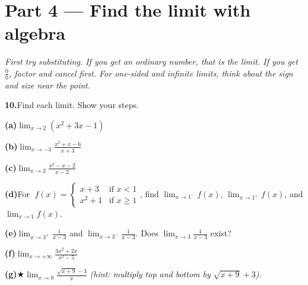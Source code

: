 \documentclass[12pt]{article}
\newcommand{\gridaxes}[1]{%
  \draw[step=1,gray!25,very thin] (-#1,-#1) grid (#1,#1);%
  \draw[thick,->] (-#1-0.4,0)--(#1+0.4,0) node[right]{$x$};%
  \draw[thick,->] (0,-#1-0.4)--(0,#1+0.4) node[above]{$y$};%
  \foreach \n in {-#1,...,#1}{\ifnum\n=0\else
      \draw (\n,0.08)--(\n,-0.08) node[below]{\scriptsize$\n$};
      \draw (0.08,\n)--(-0.08,\n) node[left]{\scriptsize$\n$};\fi}%
}
\begin{document}
\begin{center}
\end{center}

\newpage
\section*{Part 4 --- Find the limit with algebra}
\textit{First try substituting. If you get an ordinary number, that is the limit. If you get $\tfrac{0}{0}$,
factor and cancel first. For one-sided and infinite limits, think about the sign and size near the point.}

\medskip
\textbf{10.}\quad Find each limit. Show your steps.

\medskip
\textbf{(a)}\quad $\displaystyle\lim_{x \to 2} (x^2 + 3x - 1)$

\vspace{17em}

\textbf{(b)}\quad $\displaystyle\lim_{x \to -3} \frac{x^2 + x - 6}{x + 3}$
\vspace{17em}

\newpage
\textbf{(c)}\quad $\displaystyle\lim_{x \to 2} \frac{x^2 - x - 2}{x - 2}$
\vspace{17em}

\textbf{(d)}\quad For $\;f(x) = \begin{cases} x + 3 & \text{if } x < 1 \\ x^2 + 1 & \text{if } x \ge 1
\end{cases}$\;, find $\displaystyle\lim_{x \to 1^-} f(x)$, $\displaystyle\lim_{x \to 1^+} f(x)$, and
$\displaystyle\lim_{x \to 1} f(x)$.
\vspace{17em}

\newpage
\textbf{(e)}\quad $\displaystyle\lim_{x \to 3^+} \frac{1}{x - 3}$ \;and\; $\displaystyle\lim_{x \to 3^-}
\frac{1}{x - 3}$. \;Does $\displaystyle\lim_{x \to 3} \frac{1}{x-3}$ exist?
\vspace{17em}

\textbf{(f)}\quad $\displaystyle\lim_{x \to +\infty} \frac{3x^2 + 2x}{x^2 - 5}$
\vspace{17em}

\medskip
\newpage
\textbf{(g)}\quad $\bigstar$\quad $\displaystyle\lim_{x \to 0} \frac{\sqrt{x + 9} - 3}{x}$
\;\textit{(hint: multiply top and bottom by $\sqrt{x+9} + 3$).}
\vspace{17em}
\end{document}
